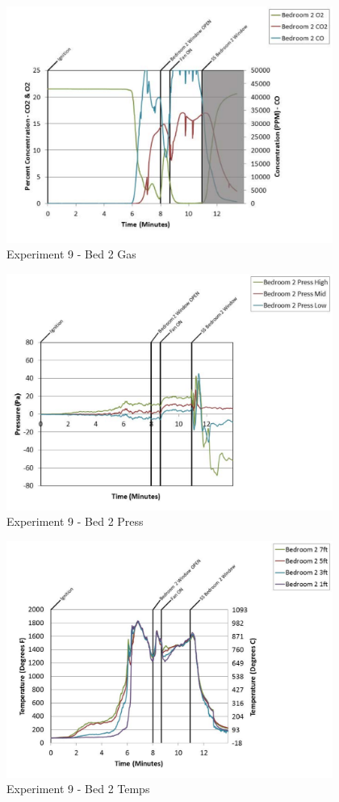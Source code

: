 \documentclass{article}
\begin{document}
\begin{appendices}
	\clearpage

	\begin{figure}[h!]
		\centering
		\includegraphics[height=3.05in]{0_Images/Results_Charts/Exp_9_Charts/Bed2Gas.pdf}
		\caption{Experiment 9 - Bed 2 Gas}
	\end{figure}
 

	\begin{figure}[h!]
		\centering
		\includegraphics[height=3.05in]{0_Images/Results_Charts/Exp_9_Charts/Bed2Press.pdf}
		\caption{Experiment 9 - Bed 2 Press}
	\end{figure}
 
	\clearpage

	\begin{figure}[h!]
		\centering
		\includegraphics[height=3.05in]{0_Images/Results_Charts/Exp_9_Charts/Bed2Temps.pdf}
		\caption{Experiment 9 - Bed 2 Temps}
	\end{figure}
 


\end{appendices}
\end{document}
